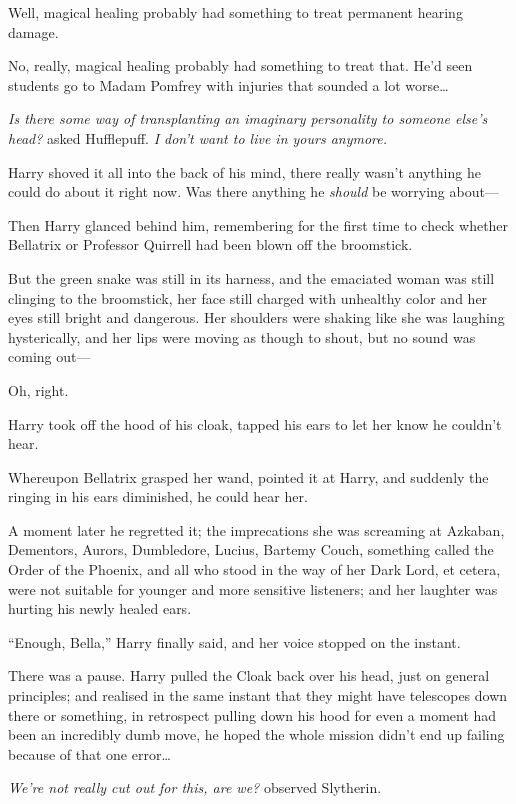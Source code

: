 Well, magical healing probably had something to treat permanent hearing
damage.

No, really, magical healing probably had something to treat that. He'd
seen students go to Madam Pomfrey with injuries that sounded a lot
worse\ldots{}

\emph{Is there some way of transplanting an imaginary personality to
someone else's head?} asked Hufflepuff. \emph{I don't want to live in
yours anymore.}

Harry shoved it all into the back of his mind, there really wasn't
anything he could do about it right now. Was there anything he
\emph{should} be worrying about---

Then Harry glanced behind him, remembering for the first time to check
whether Bellatrix or Professor Quirrell had been blown off the
broomstick.

But the green snake was still in its harness, and the emaciated woman
was still clinging to the broomstick, her face still charged with
unhealthy color and her eyes still bright and dangerous. Her shoulders
were shaking like she was laughing hysterically, and her lips were
moving as though to shout, but no sound was coming out---

Oh, right.

Harry took off the hood of his cloak, tapped his ears to let her know he
couldn't hear.

Whereupon Bellatrix grasped her wand, pointed it at Harry, and suddenly
the ringing in his ears diminished, he could hear her.

A moment later he regretted it; the imprecations she was screaming at
Azkaban, Dementors, Aurors, Dumbledore, Lucius, Bartemy Couch, something
called the Order of the Phoenix, and all who stood in the way of her
Dark Lord, et cetera, were not suitable for younger and more sensitive
listeners; and her laughter was hurting his newly healed ears.

``Enough, Bella,'' Harry finally said, and her voice stopped on the
instant.

There was a pause. Harry pulled the Cloak back over his head, just on
general principles; and realised in the same instant that they might
have telescopes down there or something, in retrospect pulling down his
hood for even a moment had been an incredibly dumb move, he hoped the
whole mission didn't end up failing because of that one error\ldots{}

\emph{We're not really cut out for this, are we?} observed Slytherin.

